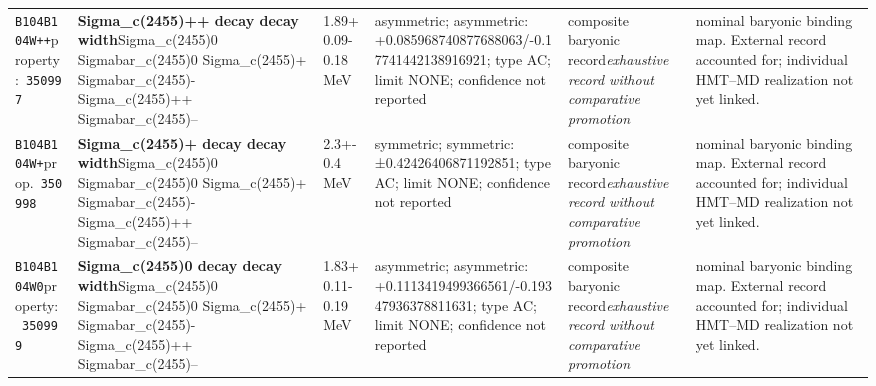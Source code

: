 \begin{landscape}
\begin{longtable}{L{1.85cm}L{4.45cm}L{2.35cm}L{4.05cm}L{3.35cm}L{7.15cm}}
\texttt{B104}\newline \texttt{B104W++}\newline property:\ \texttt{350997} & \textbf{Sigma\_\allowbreak{}c(2455)++ decay decay width}\newline Sigma\_\allowbreak{}c(2455)0 \textbar{}\allowbreak{} Sigmabar\_\allowbreak{}c(2455)0 \textbar{}\allowbreak{} Sigma\_\allowbreak{}c(2455)+ \textbar{}\allowbreak{} Sigmabar\_\allowbreak{}c(2455)- \textbar{}\allowbreak{} Sigma\_\allowbreak{}c(2455)++ \textbar{}\allowbreak{} Sigmabar\_\allowbreak{}c(2455)-- & 1.89+0.09-0.18\,MeV & asymmetric; asymmetric: +0.085968740877688063/-0.17741442138916921; type AC; limit NONE; confidence not reported & composite baryonic record\newline \emph{exhaustive record without comparative promotion} & nominal baryonic binding map. External record accounted for; individual HMT--MD realization not yet linked. \\
\texttt{B104}\newline \texttt{B104W+}\newline prop.\ \texttt{350998} & \textbf{Sigma\_\allowbreak{}c(2455)+ decay decay width}\newline Sigma\_\allowbreak{}c(2455)0 \textbar{}\allowbreak{} Sigmabar\_\allowbreak{}c(2455)0 \textbar{}\allowbreak{} Sigma\_\allowbreak{}c(2455)+ \textbar{}\allowbreak{} Sigmabar\_\allowbreak{}c(2455)- \textbar{}\allowbreak{} Sigma\_\allowbreak{}c(2455)++ \textbar{}\allowbreak{} Sigmabar\_\allowbreak{}c(2455)-- & 2.3+-0.4\,MeV & symmetric; symmetric: ±0.42426406871192851; type AC; limit NONE; confidence not reported & composite baryonic record\newline \emph{exhaustive record without comparative promotion} & nominal baryonic binding map. External record accounted for; individual HMT--MD realization not yet linked. \\
\texttt{B104}\newline \texttt{B104W0}\newline property:\ \texttt{350999} & \textbf{Sigma\_\allowbreak{}c(2455)0 decay decay width}\newline Sigma\_\allowbreak{}c(2455)0 \textbar{}\allowbreak{} Sigmabar\_\allowbreak{}c(2455)0 \textbar{}\allowbreak{} Sigma\_\allowbreak{}c(2455)+ \textbar{}\allowbreak{} Sigmabar\_\allowbreak{}c(2455)- \textbar{}\allowbreak{} Sigma\_\allowbreak{}c(2455)++ \textbar{}\allowbreak{} Sigmabar\_\allowbreak{}c(2455)-- & 1.83+0.11-0.19\,MeV & asymmetric; asymmetric: +0.1113419499366561/-0.19347936378811631; type AC; limit NONE; confidence not reported & composite baryonic record\newline \emph{exhaustive record without comparative promotion} & nominal baryonic binding map. External record accounted for; individual HMT--MD realization not yet linked. \\

\end{longtable}
\end{landscape}
